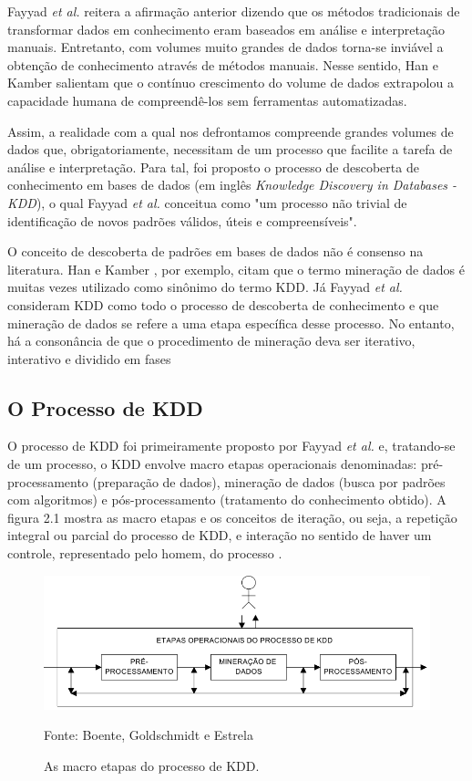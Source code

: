 \documentclass[tg]{mdtufsm}
\begin{document}
Fayyad \textit{et al.} \citeyearpar{fayyad} reitera a afirmação anterior dizendo que os métodos tradicionais de transformar dados em conhecimento eram baseados em análise e interpretação manuais. Entretanto, com volumes muito grandes de dados torna-se inviável a obtenção de conhecimento através de métodos manuais. Nesse sentido, Han e Kamber \citeyearpar{Han-kamber2nd} salientam que o contínuo crescimento do volume de dados extrapolou a capacidade humana de compreendê-los sem ferramentas automatizadas.

Assim, a realidade com a qual nos defrontamos compreende grandes volumes de dados que, obrigatoriamente, necessitam de um processo que facilite a tarefa de análise e interpretação. Para tal, foi proposto o processo de descoberta de conhecimento em bases de dados (em inglês \textit{Knowledge Discovery in Databases - KDD}), o qual Fayyad \citeyearpar{fayyad} \textit{et al.} conceitua como "um processo não trivial de identificação de novos padrões válidos, úteis e compreensíveis". 

O conceito de descoberta de padrões em bases de dados não é consenso na literatura. Han e Kamber \citeyearpar{Han-kamber2nd}, por exemplo, citam que o termo mineração de dados é muitas vezes utilizado como sinônimo do termo KDD. Já Fayyad \textit{et al.} \citeyearpar{Han-kamber2nd} consideram KDD como todo o processo de descoberta de conhecimento e que mineração de dados se refere a uma etapa específica desse processo. No entanto, há a consonância de que o procedimento de mineração deva ser iterativo, interativo e dividido em fases \cite{cassio-joao}  

\subsection{O Processo de KDD}

O processo de KDD foi primeiramente proposto por Fayyad \textit{et al.} \citeyearpar{fayyad} e, tratando-se de um processo, o KDD envolve macro etapas operacionais denominadas: pré-processamento (preparação de dados), mineração de dados (busca por padrões com algoritmos) e pós-processamento (tratamento do conhecimento obtido). A figura 2.1 mostra as macro etapas e os conceitos de iteração, ou seja, a repetição integral ou parcial do processo de KDD, e interação no sentido de haver um controle, representado pelo homem, do processo \cite{Boente-Goldschmidt}.

\begin{figure}[!htb]
	\centering
	\includegraphics[scale=0.8]{images/KDD-macro.png}
	\caption{As macro etapas do processo de KDD. } 
	\small{Fonte: Boente, Goldschmidt e Estrela \citeyearpar{Boente-Goldschmidt}}
\end{figure}
\end{document}
